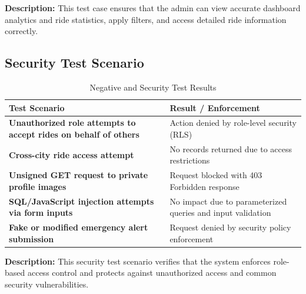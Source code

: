 \noindent
\textbf{Description:} This test case ensures that the admin can view accurate dashboard analytics and ride statistics, apply filters, and access detailed ride information correctly.


\subsection{Security Test Scenario}

\begin{table}[H]
\centering
\label{tab:testcase-security}
\renewcommand{\arraystretch}{1.2}
\begin{tabular}{|>{\bfseries}p{6cm}|p{8cm}|}
\hline
Test Scenario & Result / Enforcement \\ \hline
Unauthorized role attempts to accept rides on behalf of others & Action denied by role-level security (RLS) \\ \hline
Cross-city ride access attempt & No records returned due to access restrictions \\ \hline
Unsigned GET request to private profile images & Request blocked with 403 Forbidden response \\ \hline
SQL/JavaScript injection attempts via form inputs & No impact due to parameterized queries and input validation \\ \hline
Fake or modified emergency alert submission & Request denied by security policy enforcement \\ \hline
\end{tabular}
\caption{Negative and Security Test Results}
\end{table}

\noindent
\textbf{Description:} This security test scenario verifies that the system enforces role-based access control and protects against unauthorized access and common security vulnerabilities.




